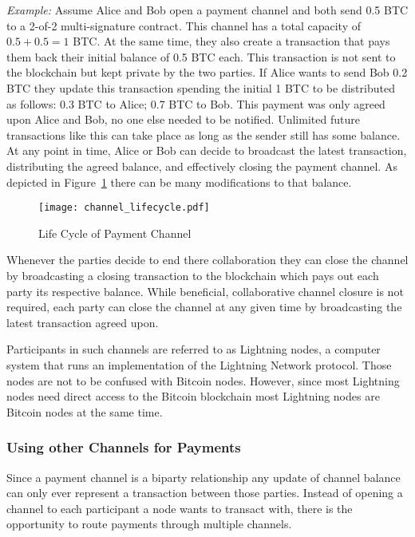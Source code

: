 \documentclass[final]{fhnwreport}       %
\begin{document}
\textit{Example:} Assume Alice and Bob open a payment channel and both send 0.5 BTC to a 2-of-2 multi-signature contract. This channel has a total capacity of $0.5 + 0.5 = 1$ BTC. At the same time, they also create a transaction that pays them back their initial balance of 0.5 BTC each. This transaction is not sent to the \gls{blockchain} but kept private by the two parties. If Alice wants to send Bob 0.2 BTC they update this transaction spending the initial 1 BTC to be distributed as follows: 0.3 BTC to Alice; 0.7 BTC to Bob. This payment was only agreed upon Alice and Bob, no one else needed to be notified. Unlimited future transactions like this can take place as long as the sender still has some balance. At any point in time, Alice or Bob can decide to broadcast the latest transaction, distributing the agreed balance, and effectively closing the payment channel. As depicted in Figure~\ref{fig:ChannelCycle} there can be many modifications to that balance.

\begin{figure}[H]
\centering
\texttt{[image: channel\_lifecycle.pdf]}
\caption{Life Cycle of Payment Channel}
\label{fig:ChannelCycle}
\end{figure}

Whenever the parties decide to end there collaboration they can close the channel by broadcasting a closing transaction to the \gls{blockchain} which pays out each party its respective balance. While beneficial, collaborative channel closure is not required, each party can close the channel at any given time by broadcasting the latest transaction agreed upon. 

Participants in such channels are referred to as Lightning nodes, a computer system that runs an implementation of the Lightning Network protocol. Those nodes are not to be confused with Bitcoin nodes. However, since most Lightning nodes need direct access to the Bitcoin \gls{blockchain} most Lightning nodes are Bitcoin nodes at the same time.

\subsubsection{Using other Channels for Payments}
Since a payment channel is a biparty relationship any update of channel balance can only ever represent a transaction between those parties. Instead of opening a channel to each participant a node wants to transact with, there is the opportunity to route payments through multiple channels.
\end{document}
